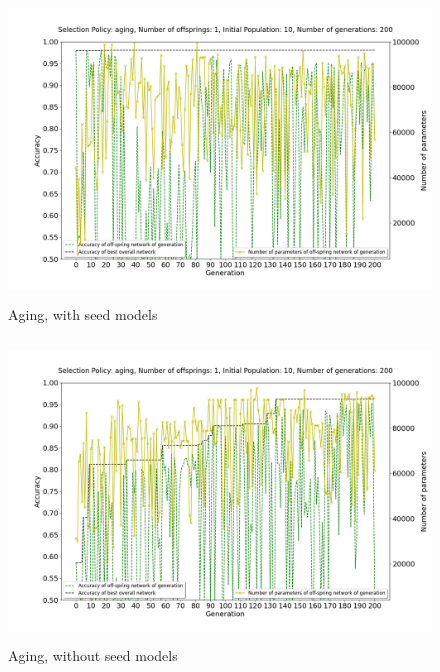 \begin{figure}[ht!]
    \centering
        \includegraphics[width=1.0\linewidth, height=8cm]{BachelorMasterThesis/ExperimentsAndResults/Figures/aging/aging_seed_model.png}
        \caption{Aging, with seed models}
        \label{fig:aging_1}
\end{figure}
\begin{figure}[ht!]
    \centering
    \includegraphics[width=1.0\linewidth, height=8cm]{BachelorMasterThesis/ExperimentsAndResults/Figures/aging/aging_no_seed_model.png}
    \caption{Aging, without seed models}
    \label{fig:aging_2}
\end{figure}

